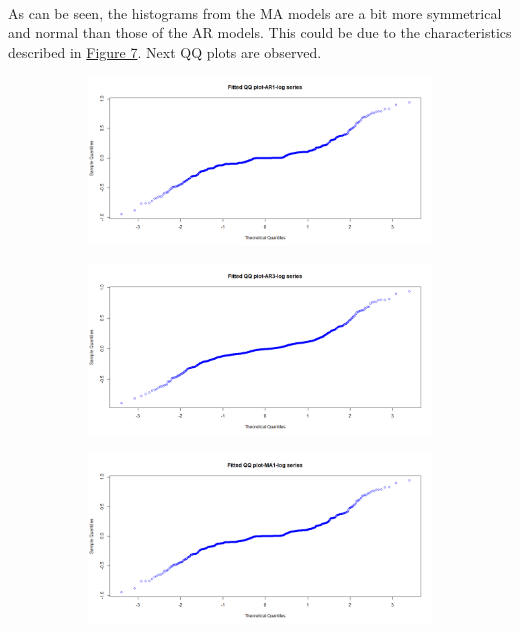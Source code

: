 \documentclass[12pt]{article}
\begin{document}
\paragraph{}
As can be seen, the histograms from the MA models are a bit more symmetrical and normal than those of the AR models. This could be due to the characteristics described in \href{figure7}{Figure 7}. Next QQ plots are observed.
\begin{figure}[H]
  \centering
  \begin{subfigure}[b]{0.49\linewidth}
    \includegraphics[width=\linewidth]{figure12-1.png}
  \end{subfigure}
  \begin{subfigure}[b]{0.49\linewidth}
    \includegraphics[width=\linewidth]{figure12-2.png}
  \end{subfigure}
  \begin{subfigure}[b]{0.49\linewidth}
    \includegraphics[width=\linewidth]{figure12-3.png}

\end{subfigure}
\end{figure}
\end{document}
